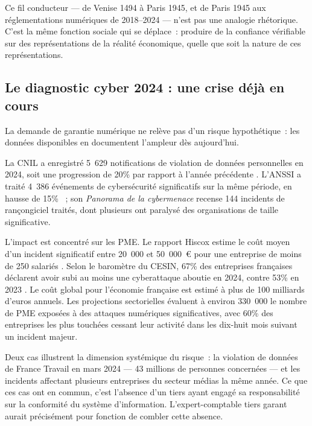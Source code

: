 \documentclass[12pt,a4paper]{article}
\begin{document}
Ce fil conducteur --- de Venise 1494 à Paris 1945, et de Paris 1945 aux réglementations numériques de 2018--2024 --- n'est pas une analogie rhétorique. C'est la même fonction sociale qui se déplace~: produire de la confiance vérifiable sur des représentations de la réalité économique, quelle que soit la nature de ces représentations.

\subsection{Le diagnostic cyber 2024 : une crise déjà en cours}

La demande de garantie numérique ne relève pas d'un risque hypothétique~: les données disponibles en documentent l'ampleur dès aujourd'hui.

La CNIL a enregistré 5~629 notifications de violation de données personnelles en 2024, soit une progression de 20\% par rapport à l'année précédente \parencite{cnil2024}. L'ANSSI a traité 4~386 événements de cybersécurité significatifs sur la même période, en hausse de 15\% \parencite{anssi2024}~; son \emph{Panorama de la cybermenace} recense 144 incidents de rançongiciel traités, dont plusieurs ont paralysé des organisations de taille significative.

L'impact est concentré sur les PME. Le rapport Hiscox estime le coût moyen d'un incident significatif entre 20~000 et 50~000~€ pour une entreprise de moins de 250 salariés \parencite{hiscox2024}. Selon le baromètre du CESIN, 67\% des entreprises françaises déclarent avoir subi au moins une cyberattaque aboutie en 2024, contre 53\% en 2023 \parencite{cesin2025}. Le coût global pour l'économie française est estimé à plus de 100 milliards d'euros annuels. Les projections sectorielles évaluent à environ 330~000 le nombre de PME exposées à des attaques numériques significatives, avec 60\% des entreprises les plus touchées cessant leur activité dans les dix-huit mois suivant un incident majeur.

Deux cas illustrent la dimension systémique du risque~: la violation de données de France Travail en mars 2024 --- 43 millions de personnes concernées --- et les incidents affectant plusieurs entreprises du secteur médias la même année. Ce que ces cas ont en commun, c'est l'absence d'un tiers ayant engagé sa responsabilité sur la conformité du système d'information. L'expert-comptable tiers garant aurait précisément pour fonction de combler cette absence.

\end{document}
